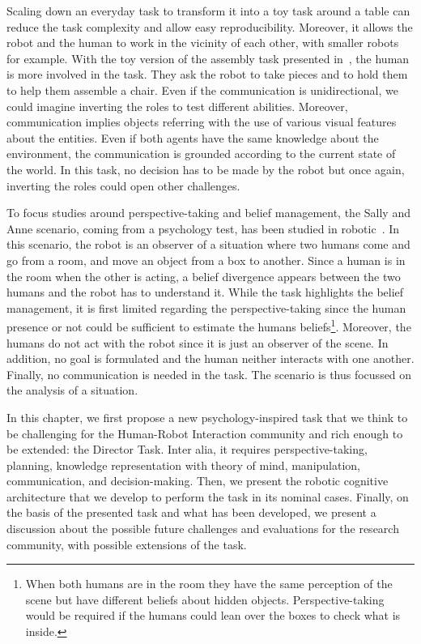 Scaling down an everyday task to transform it into a toy task around a table can reduce the task complexity and allow easy reproducibility. Moreover, it allows the robot and the human to work in the vicinity of each other, with smaller robots for example. With the toy version of the assembly task presented in~\cite{brawer_2018_situated}, the human is more involved in the task. They ask the robot to take pieces and to hold them to help them assemble a chair. Even if the communication is unidirectional, we could imagine inverting the roles to test different abilities. Moreover, communication implies objects referring with the use of various visual features about the entities. Even if both agents have the same knowledge about the environment, the communication is grounded according to the current state of the world. In this task, no decision has to be made by the robot but once again, inverting the roles could open other challenges.

To focus studies around perspective-taking and belief management, the Sally and Anne scenario, coming from a psychology test, has been studied in robotic~\cite{milliez_2014_framework}. In this scenario, the robot is an observer of a situation where two humans come and go from a room, and move an object from a box to another. Since a human is in the room when the other is acting, a belief divergence appears between the two humans and the robot has to understand it. While the task highlights the belief management, it is first limited regarding the perspective-taking since the human presence or not could be sufficient to estimate the humans beliefs\footnote{When both humans are in the room they have the same perception of the scene but have different beliefs about hidden objects. Perspective-taking would be required if the humans could lean over the boxes to check what is inside.}. Moreover, the humans do not act with the robot since it is just an observer of the scene. In addition, no goal is formulated and the human neither interacts with one another. Finally, no communication is needed in the task. The scenario is thus focussed on the analysis of a situation.

In this chapter, we first propose a new psychology-inspired task that we think to be challenging for the Human-Robot Interaction community and rich enough to be extended: the Director Task. Inter alia, it requires perspective-taking, planning, knowledge representation with theory of mind, manipulation, communication, and decision-making. Then, we present the robotic cognitive architecture that we develop to perform the task in its nominal cases. Finally, on the basis of the presented task and what has been developed, we present a discussion about the possible future challenges and evaluations for the research community, with possible extensions of the task.


